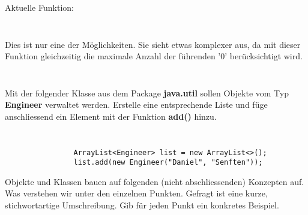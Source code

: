 \documentclass[12pt,a4paper]{exam}
\begin{document}
\begin{questions}
        Aktuelle Funktion:

        \inputminted[autogobble,firstline=75,lastline=78]
        {java}{../java/time/Display.java}
        \inputminted[autogobble,firstline=40,lastline=46]
        {java}{../java/time/NumberDisplay.java}


        \addpoints
        \ifprintanswers
        \begin{solution}
            Dies ist nur eine der Möglichkeiten. Sie sieht etwas komplexer
            aus, da mit dieser Funktion gleichzeitig die maximale
            Anzahl der führenden '0' berücksichtigt wird.
            \inputminted[autogobble,firstline=92,lastline=95]
            {java}{../java/time/Display.java}
            \inputminted[autogobble,firstline=48,lastline=53]
            {java}{../java/time/NumberDisplay.java}
        \end{solution}
        \else\makeemptybox{\fill}\newpage
        \fi


        \question[10]
        Mit der folgender Klasse aus dem Package \textbf{java.util} sollen
        Objekte vom Typ \textbf{Engineer} verwaltet werden. Erstelle eine
        entsprechende Liste und füge anschliessend ein Element mit der
        Funktion \textbf{add()} hinzu.

        \inputminted[autogobble,linenos,firstline=8,lastline=12]
        {java}{../java/collections/ArrayList.java}
        \inputminted[autogobble,linenos,firstline=22]
        {java}{../java/collections/ArrayList.java}

        \ifprintanswers
        \begin{solution}
            \begin{verbatim}
                ArrayList<Engineer> list = new ArrayList<>();
                list.add(new Engineer("Daniel", "Senften"));
            \end{verbatim}
        \end{solution}
        \else\makeemptybox{5cm}\newpage
        \fi

        \question
        Objekte und Klassen bauen auf folgenden (nicht abschliessenden) Konzepten auf.
        Was verstehen wir unter den einzelnen Punkten. Gefragt ist eine kurze, stichwortartige
        Umschreibung. Gib für jeden Punkt ein konkretes Beispiel.

        \begin{parts}

\end{parts}
\end{questions}
\end{document}
